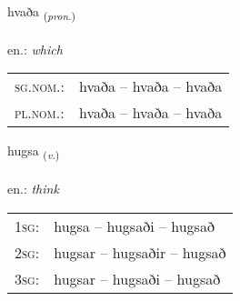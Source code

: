 \documentclass[frontgrid, backgrid]{flacards}\usepackage[]{graphicx}\usepackage[]{xcolor}
\begin{document}
{hvaða \small{\textsubscript{(\textit{pron.})}} \\[1ex] %
\textphonetic{[kʰvaːða]} \\
en.: \emph{which} \\  [2ex]
\renewcommand*{\arraystretch}{0.8}
\begin{tabular}{ll}
\textsc{sg.nom.}: & hvaða  --  hvaða -- hvaða \\ 
\textsc{pl.nom.}: & hvaða -- hvaða -- hvaða
\end{tabular}
}

\renewcommand{\flhead}{\vskip5pt \fboxsep=0pt {\small\bfseries\footnotesize Sagnorð | Verb}}
\renewcommand{\fcfoot}{\vskip5pt \fboxsep=0pt \hspace{2pt}{\small\bfseries\footnotesize 1K}}

\renewcommand{\blhead}{\vskip5pt {\small\bfseries\footnotesize Sagnorð | Verb }}
\renewcommand{\bcfoot}{\vskip5pt \hspace{2pt}{\small\bfseries\footnotesize 1K}}


{hugsa \small{\textsubscript{(\textit{v.})}} \\[1ex] %
\textphonetic{[hʏksa]} \\
en.: \emph{think} \\  [2ex]
\renewcommand*{\arraystretch}{0.8}
\begin{tabular}{p{1cm}l}
\textsc{1sg}: & hugsa -- hugsaði -- hugsað \\ 
\textsc{2sg}: & hugsar -- hugsaðir -- hugsað \\ 
\textsc{3sg}: & hugsar -- hugsaði -- hugsað \\ 
\end{tabular}
}

\renewcommand{\flhead}{\vskip5pt \fboxsep=0pt {\small\bfseries\footnotesize Sagnorð | Verb}}
\renewcommand{\fcfoot}{\vskip5pt \fboxsep=0pt \hspace{2pt}{\small\bfseries\footnotesize 1K}}

\renewcommand{\blhead}{\vskip5pt {\small\bfseries\footnotesize Sagnorð | Verb }}
\renewcommand{\bcfoot}{\vskip5pt \hspace{2pt}{\small\bfseries\footnotesize 1K}}
\end{document}
